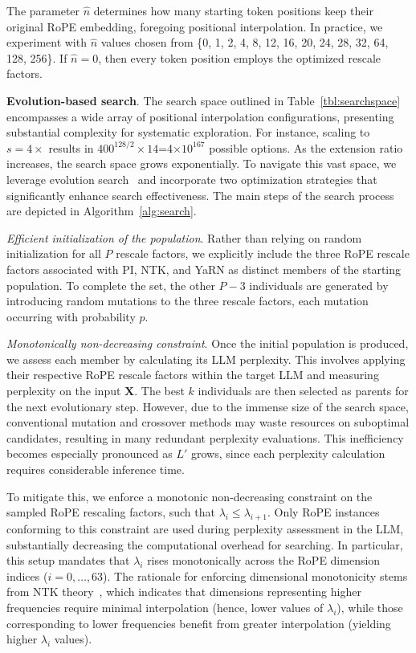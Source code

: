 The parameter $\hat{n}$ determines how many starting token positions keep their original RoPE embedding, foregoing positional interpolation. In practice, we experiment with $\hat{n}$ values chosen from \{0, 1, 2, 4, 8, 12, 16, 20, 24, 28, 32, 64, 128, 256\}. If $\hat{n}=0$, then every token position employs the optimized rescale factors.

\textbf{Evolution-based search}. The search space outlined in Table~\ref{tbl:searchspace} encompasses a wide array of positional interpolation configurations, presenting substantial complexity for systematic exploration. For instance, scaling to $s=4\times$ results in $400^{128/2}\times14$=4$\times10^{167}$ possible options. As the extension ratio increases, the search space grows exponentially. To navigate this vast space, we leverage evolution search~\cite{guo2020single} and incorporate two optimization strategies that significantly enhance search effectiveness. The main steps of the search process are depicted in Algorithm~\ref{alg:search}.

\textit{Efficient initialization of the population}. Rather than relying on random initialization for all $P$ rescale factors, we explicitly include the three RoPE rescale factors associated with PI, NTK, and YaRN as distinct members of the starting population. To complete the set, the other $P-3$ individuals are generated by introducing random mutations to the three rescale factors, each mutation occurring with probability $p$.

\textit{Monotonically non-decreasing constraint}. Once the initial population is produced, we assess each member by calculating its LLM perplexity. This involves applying their respective RoPE rescale factors within the target LLM and measuring perplexity on the input $\mathbf{X}$. The best $k$ individuals are then selected as parents for the next evolutionary step. However, due to the immense size of the search space, conventional mutation and crossover methods may waste resources on suboptimal candidates, resulting in many redundant perplexity evaluations. This inefficiency becomes especially pronounced as $L'$ grows, since each perplexity calculation requires considerable inference time.

To mitigate this, we enforce a monotonic non-decreasing constraint on the sampled RoPE rescaling factors, such that $\lambda_i \leq \lambda_{i+1}$. Only RoPE instances conforming to this constraint are used during perplexity assessment in the LLM, substantially decreasing the computational overhead for searching. In particular, this setup mandates that $\lambda_i$ rises monotonically across the RoPE dimension indices ($i=0,\ldots,63$). The rationale for enforcing dimensional monotonicity stems from NTK theory~\cite{jacot2018neural,tancik2020fourier,ntk}, which indicates that dimensions representing higher frequencies require minimal interpolation (hence, lower values of $\lambda_i$), while those corresponding to lower frequencies benefit from greater interpolation (yielding higher $\lambda_i$ values).

